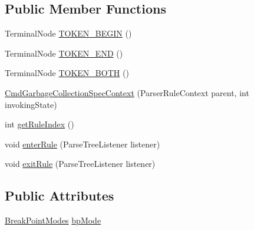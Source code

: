 \subsection*{Public Member Functions}
\begin{DoxyCompactItemize}
\item 
Terminal\+Node \hyperlink{classgov_1_1nasa_1_1jpf_1_1inspector_1_1server_1_1expression_1_1parser_1_1_expression_grammar_pa9b16c5c3aaa9986dba28b01bf7446bf9_ac7c79119de275df9ed1688386648cc46}{T\+O\+K\+E\+N\+\_\+\+B\+E\+G\+IN} ()
\item 
Terminal\+Node \hyperlink{classgov_1_1nasa_1_1jpf_1_1inspector_1_1server_1_1expression_1_1parser_1_1_expression_grammar_pa9b16c5c3aaa9986dba28b01bf7446bf9_ae078f7db0528352bf526af796639d5db}{T\+O\+K\+E\+N\+\_\+\+E\+ND} ()
\item 
Terminal\+Node \hyperlink{classgov_1_1nasa_1_1jpf_1_1inspector_1_1server_1_1expression_1_1parser_1_1_expression_grammar_pa9b16c5c3aaa9986dba28b01bf7446bf9_ae8ca7849a370b33fbb5754b24b0f7f51}{T\+O\+K\+E\+N\+\_\+\+B\+O\+TH} ()
\item 
\hyperlink{classgov_1_1nasa_1_1jpf_1_1inspector_1_1server_1_1expression_1_1parser_1_1_expression_grammar_pa9b16c5c3aaa9986dba28b01bf7446bf9_aeddaa5861833dfe105f449843f97456e}{Cmd\+Garbage\+Collection\+Spec\+Context} (Parser\+Rule\+Context parent, int invoking\+State)
\item 
int \hyperlink{classgov_1_1nasa_1_1jpf_1_1inspector_1_1server_1_1expression_1_1parser_1_1_expression_grammar_pa9b16c5c3aaa9986dba28b01bf7446bf9_aa24423eb09f31e03c24ba6f8540cfd88}{get\+Rule\+Index} ()
\item 
void \hyperlink{classgov_1_1nasa_1_1jpf_1_1inspector_1_1server_1_1expression_1_1parser_1_1_expression_grammar_pa9b16c5c3aaa9986dba28b01bf7446bf9_aa3c3b39db69b0a8e4e7b086cb3580370}{enter\+Rule} (Parse\+Tree\+Listener listener)
\item 
void \hyperlink{classgov_1_1nasa_1_1jpf_1_1inspector_1_1server_1_1expression_1_1parser_1_1_expression_grammar_pa9b16c5c3aaa9986dba28b01bf7446bf9_a0ba20803fda2c3787e99a1c0ac808fbe}{exit\+Rule} (Parse\+Tree\+Listener listener)
\end{DoxyCompactItemize}
\subsection*{Public Attributes}
\begin{DoxyCompactItemize}
\item 
\hyperlink{enumgov_1_1nasa_1_1jpf_1_1inspector_1_1server_1_1breakpoints_1_1_break_point_modes}{Break\+Point\+Modes} \hyperlink{classgov_1_1nasa_1_1jpf_1_1inspector_1_1server_1_1expression_1_1parser_1_1_expression_grammar_pa9b16c5c3aaa9986dba28b01bf7446bf9_a1056b2df66c7f35c5a0a38ccad14b861}{bp\+Mode}
\end{DoxyCompactItemize}


